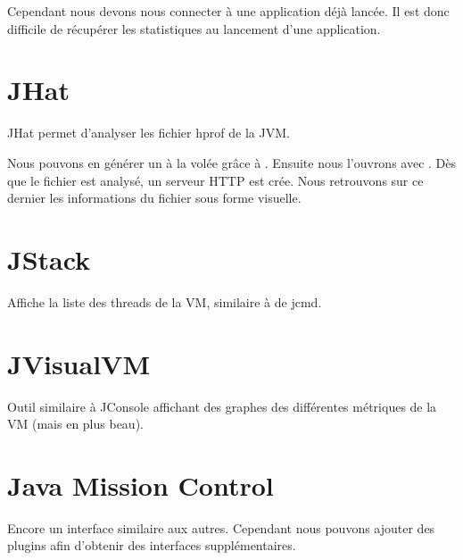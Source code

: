 \documentclass{report}
\begin{document}
			Cependant nous devons nous connecter à une application déjà lancée.
			Il est donc difficile de récupérer les statistiques au lancement d'une application.
			
		\section{JHat}
			JHat permet d'analyser les fichier hprof de la JVM.
			
			Nous pouvons en générer un à la volée grâce à .
			Ensuite nous l'ouvrons avec .
			Dès que le fichier est analysé, un serveur HTTP est crée.
			Nous retrouvons sur ce dernier les informations du fichier sous forme visuelle.
			
			
		\section{JStack}
			Affiche la liste des threads de la VM, similaire à  de jcmd.
			
		\section{JVisualVM}
			Outil similaire à JConsole affichant des graphes des différentes métriques de la VM (mais en plus beau).
			
		\section{Java Mission Control}
			Encore un interface similaire aux autres.
			Cependant nous pouvons ajouter des plugins afin d'obtenir des interfaces supplémentaires.
			
\end{document}
